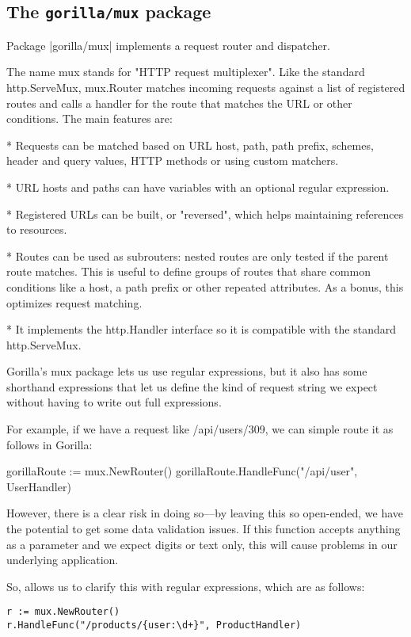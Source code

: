 \subsection{The \texttt{gorilla/mux} package}

Package |gorilla/mux| implements a request router and dispatcher.

The name mux stands for "HTTP request multiplexer". Like the standard http.ServeMux, mux.Router matches incoming requests against a list of registered routes and calls a handler for the route that matches the URL or other conditions. The main features are:

* Requests can be matched based on URL host, path, path prefix, schemes,
  header and query values, HTTP methods or using custom matchers.
  
* URL hosts and paths can have variables with an optional regular
  expression.
  
* Registered URLs can be built, or "reversed", which helps maintaining
  references to resources.
  
* Routes can be used as subrouters: nested routes are only tested if the
  parent route matches. This is useful to define groups of routes that
  share common conditions like a host, a path prefix or other repeated
  attributes. As a bonus, this optimizes request matching.
  
* It implements the http.Handler interface so it is compatible with the
  standard http.ServeMux.


Gorilla's mux package lets us use regular expressions, but it also has some shorthand expressions that let us define the kind of request string we expect without having to write out full expressions.

For example, if we have a request like /api/users/309, we can simple route it as follows in Gorilla:

\begin{teX}
gorillaRoute := mux.NewRouter()
gorillaRoute.HandleFunc("/api/{user}", UserHandler)
\end{teX}


However, there is a clear risk in doing so—by leaving this so open-ended, we have the potential to get some data validation issues. If this function accepts anything as a parameter and we expect digits or text only, this will cause problems in our underlying application.

So,  allows us to clarify this with regular expressions, which are as follows:

\begin{lstlisting}
r := mux.NewRouter()
r.HandleFunc("/products/{user:\d+}", ProductHandler)
\end{lstlisting}





